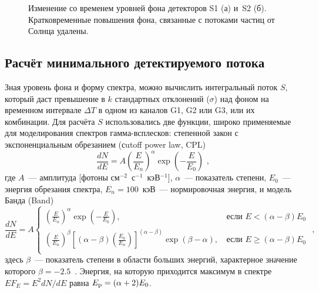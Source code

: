 \begin{figure}[h]
  \begin{minipage}[h]{0.5\textwidth}
  \end{minipage}
  \hfill
  \begin{minipage}[h]{0.5\textwidth}
  \end{minipage}
  \caption[Изменение со временем уровней фона детекторов S1 и~S2]
  {Изменение со временем уровней фона детекторов S1 (а) и~S2 (б). 
  Кратковременные повышения фона, связанные с потоками частиц от Солнца удалены.}
  \label{img:KW_bg_drift}  
\end{figure}

\subsection{Расчёт минимального детектируемого потока}
Зная уровень фона и форму спектра, можно вычислить интегральный поток $S$, который 
даст превышение в $k$ стандартных отклонений ($\sigma$) над фоном на временном 
интервале $\Delta T$ в одном из каналов G1, G2 или G3, или их комбинации.
Для расчёта $S$ использовались две функции, широко применяемые для моделирования 
спектров гамма-всплесков: степенной закон с экспоненциальным обрезанием (сutoff power law, CPL)
\begin{equation}\label{eq:CPL}
\frac{dN}{dE} = A \left(\frac{E}{E_n}\right)^\alpha \exp\left(-\frac{E}{E_0}\right) \mbox{ ,}
\end{equation}
где $A$~--- амплитуда [фотоны см$^{-2}$~с$^{-1}$~кэВ$^{-1}$], $\alpha$~--- показатель степени,
$E_0$~--- энергия обрезания спектра, $E_n = 100$~кэВ~--- нормировочная энергия,
и модель Банда (Band)~\citep{Band_1993ApJ}
\begin{equation}\label{eq:Band}
\frac{dN}{dE}=A \left\{
\begin{array}{lr}
\left(\frac{E}{E_n}\right)^\alpha \exp\left(-\frac{E}{E_0}\right) \mbox{, } 
&\mbox{если } E<(\alpha-\beta)E_0\\
\left(\frac{E}{E_n}\right)^\beta 
\left[(\alpha-\beta)\left(\frac{E_0}{E_n}\right)\right]^{(\alpha-\beta)} 
\exp(\beta-\alpha)  \mbox{, } &\mbox{если } E\geq(\alpha-\beta)E_0 \\
\end{array}
\right. \mbox{ ,}
\end{equation}
здесь $\beta$~--- показатель степени в области больших энергий, 
характерное значение которого $\beta = -2.5$~\citep{Goldstein_2013ApJS, Gruber_2014ApJS}. 
Энергия, на которую приходится максимум в спектре $E F_E = E^2 dN/dE$ равна $E_{\mathrm{p}}=(\alpha+2) E_0$.


